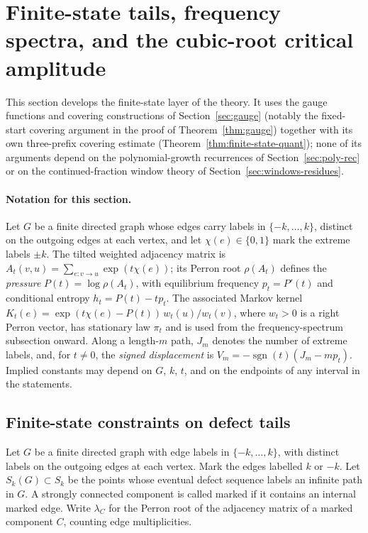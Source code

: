 \documentclass[11pt]{article}
\theoremstyle{definition}
\theoremstyle{remark}
\begin{document}
\section{Finite-state tails, frequency spectra, and the cubic-root critical amplitude}\label{sec:finite-state}

This section develops the finite-state layer of the theory. It
uses the gauge functions and covering constructions of
Section~\ref{sec:gauge} (notably the fixed-start covering
argument in the proof of Theorem~\ref{thm:gauge}) together with
its own three-prefix covering estimate
(Theorem~\ref{thm:finite-state-quant}); none of its arguments
depend on the polynomial-growth recurrences of
Section~\ref{sec:poly-rec} or on the continued-fraction window
theory of Section~\ref{sec:windows-residues}.

\paragraph{Notation for this section.}
Let $G$ be a finite directed graph whose edges carry labels in
$\{-k,\ldots,k\}$, distinct on the outgoing edges at each
vertex, and let $\chi(e)\in\{0,1\}$ mark the extreme labels
$\pm k$. The tilted weighted adjacency matrix is
$A_t(v,u)=\sum_{e:v\to u}\exp(t\chi(e))$; its Perron root
$\rho(A_t)$ defines the \emph{pressure} $P(t)=\log\rho(A_t)$,
with equilibrium frequency $p_t=P'(t)$ and conditional entropy
$h_t=P(t)-tp_t$. The associated Markov kernel
$K_t(e)=\exp(t\chi(e)-P(t))\,w_t(u)/w_t(v)$, where $w_t>0$ is a
right Perron vector, has stationary law $\pi_t$ and is used
from the frequency-spectrum subsection onward. Along a
length-$m$ path, $J_m$ denotes the number of extreme labels,
and, for $t\ne0$, the \emph{signed displacement} is
$V_m=-\operatorname{sgn}(t)(J_m-mp_t)$. Implied constants may
depend on $G$, $k$, $t$, and on the endpoints of any interval
in the statements.

\subsection{Finite-state constraints on defect tails}\label{sec:finite-state-tail}

Let $G$ be a finite directed graph with edge labels in
$\{-k,\ldots,k\}$, with distinct labels on the outgoing edges at each
vertex. Mark the edges labelled $k$ or $-k$. Let $S_k(G)\subset S_k$ be
the points whose eventual defect sequence labels an infinite path in $G$.
A strongly connected component is called marked if it contains an internal
marked edge. Write $\lambda_C$ for the Perron root of the adjacency matrix
of a marked component $C$, counting edge multiplicities.
\end{document}
